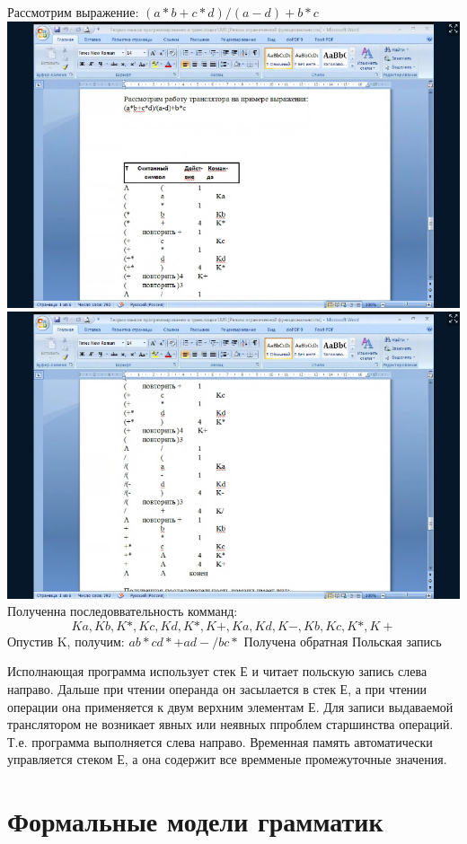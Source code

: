 \documentclass{article}
\begin{document}
    Рассмотрим выражение: $(a*b+c*d)/(a-d)+b*c$ \\

    \includegraphics[scale=0.5]{pictures/5.png}
    \includegraphics[scale=0.5]{pictures/6.png}
    Полученна последоввательность комманд:
    $$
       Ka, Kb, K*, Kc, Kd, K*, K+, Ka, Kd, K-, Kb, Kc, K*, K+
    $$
    Опустив K, получим: $ab*cd*+ad-/bc*$
    Получена обратная Польская запись

    Исполнающая программа использует стек Е и читает польскую запись слева направо.
    Дальше при чтении операнда он засылается в стек Е, а при чтении операции она применяется к двум верхним элементам Е.
    Для записи выдаваемой транслятором не возникает явных или неявных ппроблем старшинства операций.
    Т.е. программа выполняется слева направо.
    Временная память автоматически управляется стеком Е, а она содержит все времменые промежуточные значения.
\newpage
    \section{Формальные модели грамматик}
\end{document}
